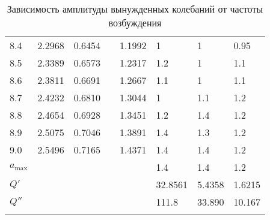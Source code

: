 \begin{longtable}{|l|l|l|l|l|l|l|l|}
	8.4        & 2.2968       & 0.6454            &  & 1.1992                         & 1       & 1      & 0.95                \\
	8.5        & 2.3389       & 0.6573            &  & 1.2317                         & 1.2     & 1      & 1.1                 \\
	8.6        & 2.3811       & 0.6691            &  & 1.2667                         & 1.1     & 1      & 1.1                 \\
	8.7        & 2.4232       & 0.6810            &  & 1.3044                         & 1       & 1.1    & 1.2                 \\
	8.8        & 2.4654       & 0.6928            &  & 1.3451                         & 1.2     & 1.4    & 1.2                 \\
	8.9        & 2.5075       & 0.7046            &  & 1.3891                         & 1.4     & 1.3    & 1.2                 \\
	9.0        & 2.5496       & 0.7165            &  & 1.4371                         & 1.4     & 1.4    & 1.2                 \\
	\hline
	$a_{\max}$ &              &                   &  &                                & 1.4     & 1.4    & 1.2                 \\
	\hline
	$Q'$       &              &                   &  &                                & 32.8561 & 5.4358 & 1.6215              \\
	\hline
	$Q''$      &              &                   &  &                                & 111.8   & 33.890 & 10.167              \\
	\hline
	\caption{Зависимость амплитуды вынужденных колебаний от частоты возбуждения}
  \label{table:a_omega}
\end{longtable}
